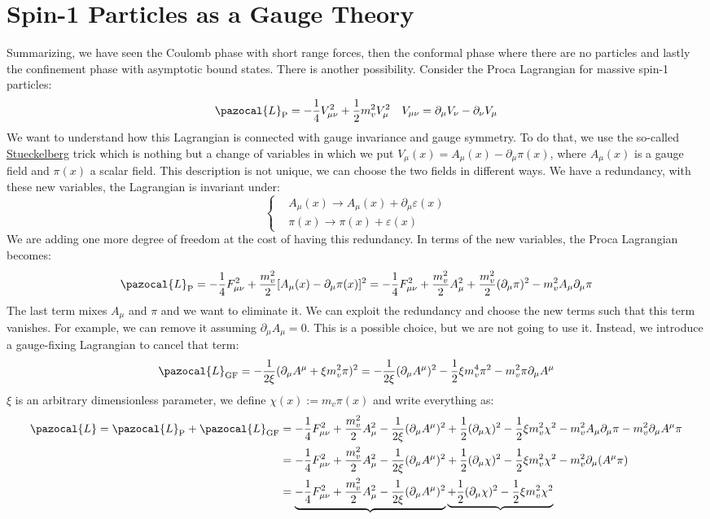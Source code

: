 \documentclass[../main.tex]{subfiles}
\begin{document}
\section{Spin-1 Particles as a Gauge Theory}
Summarizing, we have seen the Coulomb phase with short range forces, then the conformal phase where there are no particles and lastly the confinement phase with asymptotic bound states. There is another possibility. Consider the Proca Lagrangian for massive spin-1 particles:
\[
\pazocal{L}_{\text{P}}=-\frac{1}{4}V_{\mu\nu}^2+\frac{1}{2}m_v^2V_\mu^2 \quad V_{\mu\nu}=\partial_\mu V_\nu-\partial_\nu V_\mu
\]
We want to understand how this Lagrangian is connected with gauge invariance and gauge symmetry. To do that, we use the so-called \href{https://en.wikipedia.org/wiki/Ernst_Stueckelberg}{Stueckelberg} trick which is nothing but a change of variables in which we put $V_\mu(x)=A_\mu(x)-\partial_\mu\pi(x)$, where $A_\mu(x)$ is a gauge field and $\pi(x)$  a scalar field. This description is not unique, we can choose the two fields in different ways. We have a redundancy, with these new variables, the Lagrangian is invariant under:
\[
\left\{
\begin{aligned}
&A_\mu(x)\to A_\mu(x)+\partial_\mu\varepsilon(x)\\
&\pi(x)\to\pi(x)+\varepsilon(x)
\end{aligned}
\right.
\]
We are adding one more degree of freedom at the cost of having this redundancy. In terms of the new variables, the Proca Lagrangian becomes:
\[
\pazocal{L}_{\text{P}}=-\frac{1}{4}F_{\mu\nu}^2+\frac{m_v^2}{2}[A_\mu(x)-\partial_\mu\pi(x)]^2=-\frac{1}{4}F_{\mu\nu}^2+\frac{m_v^2}{2}A^2_\mu+\frac{m_v^2}{2}(\partial_\mu\pi)^2-m_v^2A_\mu\partial_\mu\pi
\]
The last term mixes $A_\mu$ and $\pi$ and we want to eliminate it. We can exploit the redundancy and choose the new terms such that this term vanishes. For example, we can remove it assuming $\partial_\mu A_\mu=0$. This is a possible choice, but we are not going to use it. Instead, we introduce a gauge-fixing Lagrangian to cancel that term:
\[
\pazocal{L}_{\text{GF}}=-\frac{1}{2\xi}(\partial_\mu A^\mu+\xi m_v^2\pi)^2=-\frac{1}{2\xi}(\partial_\mu A^\mu)^2-\frac{1}{2}\xi m_v^4\pi^2-m_v^2\pi\partial_\mu A^\mu
\]
$\xi$ is an arbitrary dimensionless parameter, we define $\chi(x):=m_v\pi(x)$ and write everything as:
\begin{align*}
\pazocal{L}=\pazocal{L}_{\text{P}}+\pazocal{L}_{\text{GF}}&=-\frac{1}{4}F_{\mu\nu}^2+\frac{m_v^2}{2}A_\mu^2-\frac{1}{2\xi}(\partial_\mu A^\mu)^2+\frac{1}{2}(\partial_\mu\chi)^2-\frac{1}{2}\xi m_v^2\chi^2-m_v^2A_\mu\partial_\mu\pi-m_v^2\partial_\mu A^\mu\pi\\
&=-\frac{1}{4}F_{\mu\nu}^2+\frac{m_v^2}{2}A_\mu^2-\frac{1}{2\xi}(\partial_\mu A^\mu)^2+\frac{1}{2}(\partial_\mu\chi)^2-\frac{1}{2}\xi m_v^2\chi^2-m_v^2\partial_\mu(A^\mu\pi)\\
&=\underbrace{-\frac{1}{4}F_{\mu\nu}^2+\frac{m_v^2}{2}A_\mu^2-\frac{1}{2\xi}(\partial_\mu A^\mu)^2}\underbrace{+\frac{1}{2}(\partial_\mu\chi)^2-\frac{1}{2}\xi m_v^2\chi^2}
\end{align*}
\end{document}
